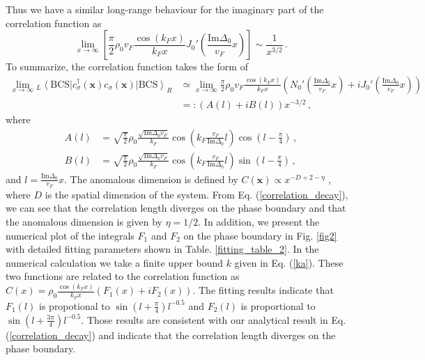 \documentclass[aps,prl,twocolumn,nofootinbib,superscriptaddress,longbibliography]{revtex4-1}
\begin{document}
Thus we have a similar long-range behaviour for the imaginary part of the correlation function as
\begin{equation}
	\lim_{x \rightarrow \infty} \left[  \frac{\pi}{2} \rho_0 v_F \frac{\cos (k_F x)}{k_Fx}
	J_0' \left( \frac{\text{Im} \Delta_0}{v_F} x \right) \right] \sim \frac{1}{x^{3 / 2}}\,.
	\label{Imexact}
\end{equation}
To summarize, the correlation function takes the form of
\begin{align}
  \lim_{x\rightarrow\infty}{}_L \left\langle\text{BCS} \right| c_{\sigma}^{\dagger}(\bm{x}) c_{\sigma}(\bm{x}) \left| \text{BCS}
  \right\rangle_R&\simeq \lim_{x\rightarrow\infty}\frac{\pi}{2} \rho_0 v_F \frac{\cos (k_F x)}{k_Fx}( N_0' ( \frac{\text{Im}\Delta_0}{v_F} x )+iJ_0'( \frac{\text{Im}\Delta_0}{v_F} x ))\nonumber\\
  &=:(A(l)+iB(l))x^{-3/2}\,,
  \label{correlation_decay}
\end{align}
where
\begin{align}
    A(l)&=\sqrt{\frac{\pi}{2}}\rho_0 \frac{\sqrt{\text{Im}\Delta_0 v_F}}{k_F} \cos (k_F \frac{v_F}{\text{Im}\Delta_0}l)\cos(l-\frac{\pi}{4})\,,\nonumber\\
    B(l)&=\sqrt{\frac{\pi}{2}}\rho_0 \frac{\sqrt{\text{Im}\Delta_0 v_F}}{k_F} \cos (k_F \frac{v_F}{\text{Im}\Delta_0}l)\sin(l-\frac{\pi}{4})\,,
\end{align}
and $l= \frac{\text{Im}\Delta_0}{v_F} x$. The anomalous dimension is defined by $C(\bm{x})\propto x^{-D+2-\eta}$ \cite{Sachdev:2011uj}, where $D$ is the spatial dimension of the system. From Eq. (\ref{correlation_decay}), we can see that the correlation length diverges on the phase boundary and that the anomalous dimension is given by $\eta=1/2$. In addition, we present the numerical plot of the integrals $F_1$ and $F_2$ on the phase boundary in Fig. \ref{fig2} with detailed fitting parameters shown in Table. \ref{fitting_table_2}. In the numerical calculation we take a finite upper bound $k$ given in Eq. (\ref{ka}). These two functions are related to the correlation function as $C(x)=\rho_0 \frac{\cos (k_F x)}{k_Fx}(F_1(x)+iF_2(x))$. %
The fitting results indicate that $F_1(l)$ is propotional to $\sin(l+\frac{\pi}{4})l^{-0.5}$ and $F_2(l)$ is proportional to $\sin(l+\frac{3\pi}{4})l^{-0.5}$. Those results are consistent with our analytical result in Eq. (\ref{correlation_decay}) and indicate that the correlation length diverges on the phase boundary.
\end{document}
